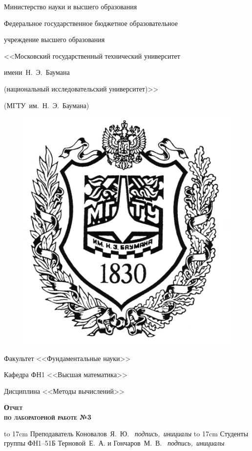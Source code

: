 \documentclass[a4paper,12pt]{extarticle}
\begin{document}
    \begin{titlepage}

        \begin{center}
            \centerline{\Large\rm Министерство науки и высшего образования}
            \centerline{\Large\rm Федеральное государственное бюджетное образовательное}
            \centerline{\Large\rm учреждение высшего образования}
            \centerline{\Large\rm <<Московский государственный технический университет}
            \centerline{\Large\rm имени~Н.~Э.~Баумана}
            \centerline{\Large\rm (национальный исследовательский университет)>>}
            \centerline{\Large\rm (МГТУ~им.~Н.~Э.~Баумана)}
            \hrulefill
        \end{center}

        \begin{figure}[h!]
            \centering
            \includegraphics[height=0.4\linewidth]{picture0}
        \end{figure}

        \begin{center}
            \centerline{\Large\rm Факультет <<Фундаментальные науки>>}
            \centerline{\Large\rm Кафедра ФН1 <<Высшая математика>>}
            \centerline{\Large\rm Дисциплина <<Методы вычислений>>}
        \end{center}

        \begin{center}
            \textsc{\textbf{\Huge Отчет}}\\
            \textsc{\textbf{\large по лабораторной работе №3}}\\
        \end{center}

        \vspace{3em}

        {
        \large
        \hbox to 17cm {Преподаватель \hspace{45pt} \hrulefill \hspace{60pt} Коновалов~Я.~Ю.}
        \vspace{-7pt}
        \hbox{{\small\it \hspace{178pt} подпись, инициалы}}
        \hbox{}
        \hbox to 17cm {Студенты группы ФН1--51Б \hrulefill \hspace{1pt} Терновой~Е.~А. и Гончаров~М.~В.}
        \vspace{-7pt}
        \hbox{{\small\it \hspace{178pt} подпись, инициалы}}
        }



\end{titlepage}
\end{document}
